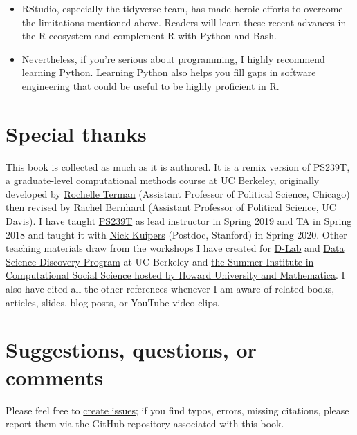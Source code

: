 \documentclass[
]{book}
\begin{document}
\begin{itemize}
  \begin{itemize}
  \item
    RStudio, especially the tidyverse team, has made heroic efforts to overcome the limitations mentioned above. Readers will learn these recent advances in the R ecosystem and complement R with Python and Bash.
  \item
    Nevertheless, if you're serious about programming, I highly recommend learning Python. Learning Python also helps you fill gaps in software engineering that could be useful to be highly proficient in R.
  \end{itemize}
\end{itemize}

\hypertarget{special-thanks}{%
\section{Special thanks}\label{special-thanks}}

This book is collected as much as it is authored. It is a remix version of \href{https://github.com/rochelleterman/PS239T}{PS239T}, a graduate-level computational methods course at UC Berkeley, originally developed by \href{http://rochelleterman.com/}{Rochelle Terman} (Assistant Professor of Political Science, Chicago) then revised by \href{http://rachelbernhard.com/}{Rachel Bernhard} (Assistant Professor of Political Science, UC Davis). I have taught \href{https://github.com/PS239T/spring_2021}{PS239T} as lead instructor in Spring 2019 and TA in Spring 2018 and taught it with \href{https://nicholaskuipers.com/}{Nick Kuipers} (Postdoc, Stanford) in Spring 2020. Other teaching materials draw from the workshops I have created for \href{https://dlab.berkeley.edu/}{D-Lab} and \href{https://data.berkeley.edu/research/discovery-program-home}{Data Science Discovery Program} at UC Berkeley and \href{https://sicss.io/2021/howard-mathematica/}{the Summer Institute in Computational Social Science hosted by Howard University and Mathematica}. I also have cited all the other references whenever I am aware of related books, articles, slides, blog posts, or YouTube video clips.

\hypertarget{suggestions-questions-or-comments}{%
\section{Suggestions, questions, or comments}\label{suggestions-questions-or-comments}}

Please feel free to \href{https://github.com/jaeyk/PS239T/issues}{create issues}; if you find typos, errors, missing citations, please report them via the GitHub repository associated with this book.
\end{document}
